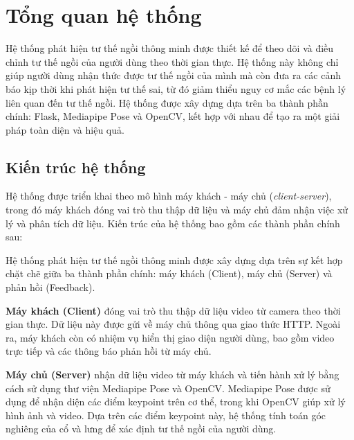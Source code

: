 \documentclass[conference]{IEEEtran}
\begin{document}
\section{Tổng quan hệ thống}
Hệ thống phát hiện tư thế ngồi thông minh được thiết kế để theo dõi và điều chỉnh tư thế ngồi của người dùng theo thời gian thực. Hệ thống này không chỉ giúp người dùng nhận thức được tư thế ngồi của mình mà còn đưa ra các cảnh báo kịp thời khi phát hiện tư thế sai, từ đó giảm thiểu nguy cơ mắc các bệnh lý liên quan đến tư thế ngồi. Hệ thống được xây dựng dựa trên ba thành phần chính: Flask, Mediapipe Pose và OpenCV, kết hợp với nhau để tạo ra một giải pháp toàn diện và hiệu quả.

\subsection{Kiến trúc hệ thống}
Hệ thống được triển khai theo mô hình máy khách - máy chủ (\textit{client-server}), trong đó máy khách đóng vai trò thu thập dữ liệu và máy chủ đảm nhận việc xử lý và phân tích dữ liệu. Kiến trúc của hệ thống bao gồm các thành phần chính sau:

Hệ thống phát hiện tư thế ngồi thông minh được xây dựng dựa trên sự kết hợp chặt chẽ giữa ba thành phần chính: máy khách (Client), máy chủ (Server) và phản hồi (Feedback). 

\textbf{Máy khách (Client)} đóng vai trò thu thập dữ liệu video từ camera theo thời gian thực. Dữ liệu này được gửi về máy chủ thông qua giao thức HTTP. Ngoài ra, máy khách còn có nhiệm vụ hiển thị giao diện người dùng, bao gồm video trực tiếp và các thông báo phản hồi từ máy chủ. 

\textbf{Máy chủ (Server)} nhận dữ liệu video từ máy khách và tiến hành xử lý bằng cách sử dụng thư viện Mediapipe Pose và OpenCV. Mediapipe Pose được sử dụng để nhận diện các điểm keypoint trên cơ thể, trong khi OpenCV giúp xử lý hình ảnh và video. Dựa trên các điểm keypoint này, hệ thống tính toán góc nghiêng của cổ và lưng để xác định tư thế ngồi của người dùng. 
\end{document}
